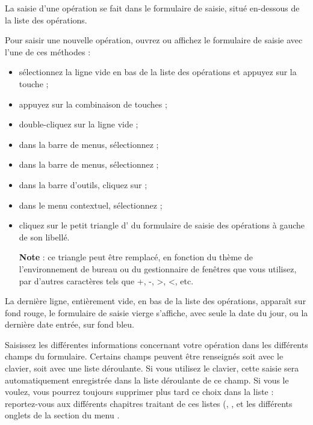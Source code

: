 La saisie d'une opération se fait dans le formulaire de saisie, situé en-dessous de la liste des opérations.

Pour saisir une nouvelle opération, ouvrez ou affichez le formulaire de saisie avec l'une de ces méthodes :

\begin{itemize}
	 \item sélectionnez la ligne vide en bas de la liste des opérations et appuyez sur la touche  ;
	 \item appuyez sur la combinaison de touches  ;
	 \item double-cliquez sur la ligne vide ;
	 \item dans la barre de menus, sélectionnez  ;
	 \item dans la barre de menus, sélectionnez  ;
	 \item dans la barre d'outils, cliquez sur  ;
	 \item dans le menu contextuel, sélectionnez  ;
	 \item cliquez sur le petit triangle d' du formulaire de saisie des opérations à gauche de son libellé.

	 \textbf{Note} : ce triangle peut être remplacé, en fonction du thème de l'environnement de bureau ou du gestionnaire de fenêtres que vous utilisez, par d'autres caractères tels que +, -, >, <, etc.
\end{itemize}

La dernière ligne, entièrement vide, en bas de la liste des opérations, apparaît sur fond rouge{\couleur}, le formulaire de saisie vierge s'affiche, avec seule la date du jour, ou la dernière date entrée, sur fond bleu{\couleur}.

Saisissez les différentes informations concernant votre opération dans les différents champs du formulaire. Certains champs peuvent être renseignés soit avec le clavier, soit avec une liste déroulante. Si vous utilisez le clavier, cette saisie sera automatiquement enregistrée dans la liste déroulante de ce champ. Si vous le voulez, vous pourrez toujours supprimer plus tard ce choix dans la liste : reportez-vous aux différents chapitres traitant de ces listes (, ,  et les différents onglets de la section  du menu .

